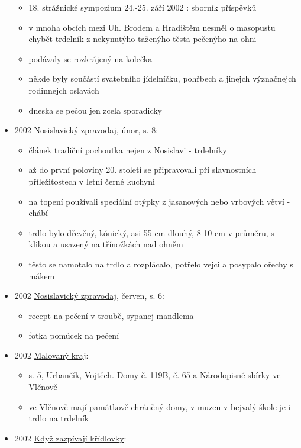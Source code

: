 \begin{itemize}
  \begin{itemize}
  \tightlist
  \item
    18. strážnické sympozium 24.-25. září 2002 : sborník příspěvků
  \item
    v mnoha obcích mezi Uh. Brodem a Hradištěm nesměl o masopustu chybět
    trdelník z nekynutýho taženýho těsta pečenýho na ohni
  \item
    podávaly se rozkrájený na kolečka
  \item
    někde byly součástí svatebního jídelníčku, pohřbech a jinejch
    význačnejch rodinnejch oslavách
  \item
    dneska se pečou jen zcela sporadicky
  \end{itemize}
\item
  2002
  \href{https://www.nosislav.cz/assets/File.ashx?id_org=10486&id_dokumenty=1709}{Nosislavický
  zpravodaj}, únor, s. 8:

  \begin{itemize}
  \tightlist
  \item
    článek tradiční pochoutka nejen z Nosislavi - trdelníky
  \item
    až do první poloviny 20. století se připravovali při slavnostních
    příležitostech v letní černé kuchyni
  \item
    na topení používali speciální otýpky z jasanových nebo vrbových
    větví - chábí
  \item
    trdlo bylo dřevěný, kónický, asi 55 cm dlouhý, 8-10 cm v průměru, s
    klikou a usazený na třínožkách nad ohněm
  \item
    těsto se namotalo na trdlo a rozplácalo, potřelo vejci a posypalo
    ořechy s mákem
  \end{itemize}
\item
  2002
  \href{https://www.nosislav.cz/assets/File.ashx?id_org=10486&id_dokumenty=1709}{Nosislavický
  zpravodaj}, červen, s. 6:

  \begin{itemize}
  \tightlist
  \item
    recept na pečení v troubě, sypanej mandlema
  \item
    fotka pomůcek na pečení
  \end{itemize}
\item
  2002
  \href{https://ceskadigitalniknihovna.cz/uuid/uuid:0e216ec0-0395-11e4-a680-5ef3fc9bb22f}{Malovaný
  kraj}:

  \begin{itemize}
  \tightlist
  \item
    s. 5, Urbančík, Vojtěch. Domy č. 119B, č. 65 a Národopisné sbírky ve
    Vlčnově
  \item
    ve Vlčnově mají památkově chráněný domy, v muzeu v bejvalý škole je
    i trdlo na trdelník
  \end{itemize}
\item
  2002
  \href{https://ceskadigitalniknihovna.cz/uuid/uuid:cd4bfec0-29e6-11ed-af34-5ef3fc9bb22f}{Když
  zazpívají křídlovky}:


\end{itemize}
